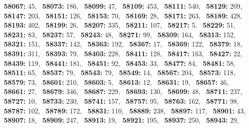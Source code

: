 \textbf{58067:} 45,\allowbreak~ 
\textbf{58073:} 186,\allowbreak~ 
\textbf{58099:} 47,\allowbreak~ 
\textbf{58109:} 453,\allowbreak~ 
\textbf{58111:} 540,\allowbreak~ 
\textbf{58129:} 209,\allowbreak~ 
\textbf{58147:} 203,\allowbreak~ 
\textbf{58151:} 126,\allowbreak~ 
\textbf{58153:} 70,\allowbreak~ 
\textbf{58169:} 28,\allowbreak~ 
\textbf{58171:} 263,\allowbreak~ 
\textbf{58189:} 428,\allowbreak~ 
\textbf{58193:} 402,\allowbreak~ 
\textbf{58199:} 26,\allowbreak~ 
\textbf{58207:} 335,\allowbreak~ 
\textbf{58211:} 107,\allowbreak~ 
\textbf{58217:} 5,\allowbreak~ 
\textbf{58229:} 51,\allowbreak~ 
\textbf{58231:} 83,\allowbreak~ 
\textbf{58237:} 57,\allowbreak~ 
\textbf{58243:} 48,\allowbreak~ 
\textbf{58271:} 99,\allowbreak~ 
\textbf{58309:} 164,\allowbreak~ 
\textbf{58313:} 152,\allowbreak~ 
\textbf{58321:} 151,\allowbreak~ 
\textbf{58337:} 142,\allowbreak~ 
\textbf{58363:} 192,\allowbreak~ 
\textbf{58367:} 17,\allowbreak~ 
\textbf{58369:} 122,\allowbreak~ 
\textbf{58379:} 18,\allowbreak~ 
\textbf{58391:} 311,\allowbreak~ 
\textbf{58393:} 79,\allowbreak~ 
\textbf{58403:} 228,\allowbreak~ 
\textbf{58411:} 128,\allowbreak~ 
\textbf{58417:} 163,\allowbreak~ 
\textbf{58427:} 22,\allowbreak~ 
\textbf{58439:} 119,\allowbreak~ 
\textbf{58441:} 181,\allowbreak~ 
\textbf{58451:} 92,\allowbreak~ 
\textbf{58453:} 33,\allowbreak~ 
\textbf{58477:} 84,\allowbreak~ 
\textbf{58481:} 58,\allowbreak~ 
\textbf{58511:} 65,\allowbreak~ 
\textbf{58537:} 79,\allowbreak~ 
\textbf{58543:} 79,\allowbreak~ 
\textbf{58549:} 14,\allowbreak~ 
\textbf{58567:} 204,\allowbreak~ 
\textbf{58573:} 118,\allowbreak~ 
\textbf{58579:} 73,\allowbreak~ 
\textbf{58601:} 210,\allowbreak~ 
\textbf{58603:} 5,\allowbreak~ 
\textbf{58613:} 12,\allowbreak~ 
\textbf{58631:} 19,\allowbreak~ 
\textbf{58657:} 46,\allowbreak~ 
\textbf{58661:} 27,\allowbreak~ 
\textbf{58679:} 346,\allowbreak~ 
\textbf{58687:} 229,\allowbreak~ 
\textbf{58693:} 130,\allowbreak~ 
\textbf{58699:} 48,\allowbreak~ 
\textbf{58711:} 237,\allowbreak~ 
\textbf{58727:} 10,\allowbreak~ 
\textbf{58733:} 230,\allowbreak~ 
\textbf{58741:} 157,\allowbreak~ 
\textbf{58757:} 95,\allowbreak~ 
\textbf{58763:} 162,\allowbreak~ 
\textbf{58771:} 98,\allowbreak~ 
\textbf{58787:} 102,\allowbreak~ 
\textbf{58789:} 172,\allowbreak~ 
\textbf{58831:} 110,\allowbreak~ 
\textbf{58889:} 238,\allowbreak~ 
\textbf{58897:} 117,\allowbreak~ 
\textbf{58901:} 43,\allowbreak~ 
\textbf{58907:} 18,\allowbreak~ 
\textbf{58909:} 247,\allowbreak~ 
\textbf{58913:} 19,\allowbreak~ 
\textbf{58921:} 195,\allowbreak~ 
\textbf{58937:} 250,\allowbreak~ 
\textbf{58943:} 29,\allowbreak~ 
